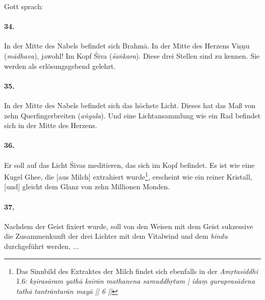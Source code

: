 \documentclass[a4paper,12pt]{article}
\begin{document}
\noindent Gott sprach:

\paragraph{34.} In der Mitte des Nabels befindet sich Brahmā. In der Mitte des Herzens Viṣṇu (\textit{mādhava}), jawohl! Im Kopf Śiva (\textit{śaṅkara}). Diese drei Stellen sind zu kennen. Sie werden als erlösungsgebend gelehrt. 

\paragraph{35.} In der Mitte des Nabels befindet sich das höchste Licht. Dieses hat das Maß von zehn Querfingerbreiten (\textit{aṅgula}). Und eine Lichtansammlung wie ein Rad befindet sich in der Mitte des Herzens.
 
\paragraph{36.} Er soll auf das Licht Śivas meditieren, das sich im Kopf befindet. Es ist wie eine Kugel Ghee, die [aus Milch] extrahiert wurde\footnote{Das Sinnbild des Extraktes der Milch findet sich ebenfalls in der \textit{Amṛtasiddhi} 1.6: \textit{kṣīrasāram yathā ksīrān mathanena samuddhṛtam | idaṃ guruprasādena tathā tantrāntarān mayā || 6 ||}}, erscheint wie ein reiner Kristall, [und] gleicht dem Glanz von zehn Millionen Monden. 

\paragraph{37.} Nachdem der Geist fixiert wurde, soll von den Weisen mit dem Geist sukzessive die Zusammenkunft der drei Lichter mit dem Vitalwind und dem \textit{bindu} durchgeführt werden, ...
\end{document}
